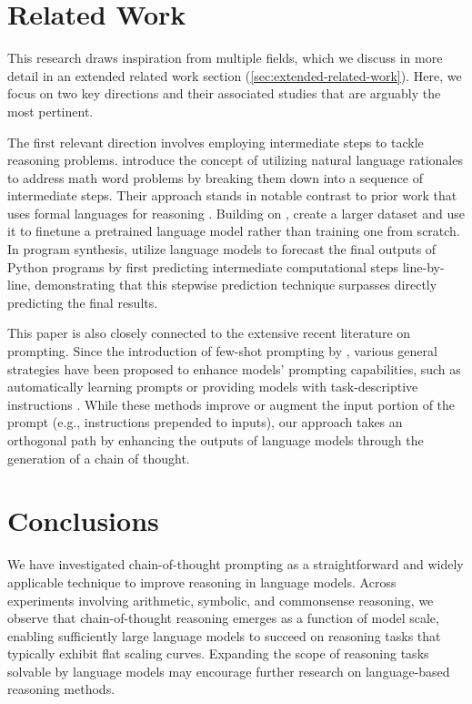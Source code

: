 \section{Related Work} This research draws inspiration from multiple fields, which we discuss in more detail in an extended related work section (\cref{sec:extended-related-work}). Here, we focus on two key directions and their associated studies that are arguably the most pertinent.

The first relevant direction involves employing intermediate steps to tackle reasoning problems. \cite{ling-etal-2017-program} introduce the concept of utilizing natural language rationales to address math word problems by breaking them down into a sequence of intermediate steps. Their approach stands in notable contrast to prior work that uses formal languages for reasoning \citep{roy-2016-reasoning, chiang-chen-2019-semantically, amini-etal-2019-mathqa, chen2019neural}. Building on \citet{ling-etal-2017-program}, \citet{cobbe2021training} create a larger dataset and use it to finetune a pretrained language model rather than training one from scratch. In program synthesis, \cite{nye2021show} utilize language models to forecast the final outputs of Python programs by first predicting intermediate computational steps line-by-line, demonstrating that this stepwise prediction technique surpasses directly predicting the final results.

This paper is also closely connected to the extensive recent literature on prompting. Since the introduction of few-shot prompting by \citet{brown2020language}, various general strategies have been proposed to enhance models' prompting capabilities, such as automatically learning prompts \citep{lester-etal-2021-power} or providing models with task-descriptive instructions \citep{wei2021finetuned,sanh2021multitask,ouyang2022training}. While these methods improve or augment the input portion of the prompt (e.g., instructions prepended to inputs), our approach takes an orthogonal path by enhancing the outputs of language models through the generation of a chain of thought.

\section{Conclusions}
We have investigated chain-of-thought prompting as a straightforward and widely applicable technique to improve reasoning in language models. Across experiments involving arithmetic, symbolic, and commonsense reasoning, we observe that chain-of-thought reasoning emerges as a function of model scale, enabling sufficiently large language models to succeed on reasoning tasks that typically exhibit flat scaling curves. Expanding the scope of reasoning tasks solvable by language models may encourage further research on language-based reasoning methods.


